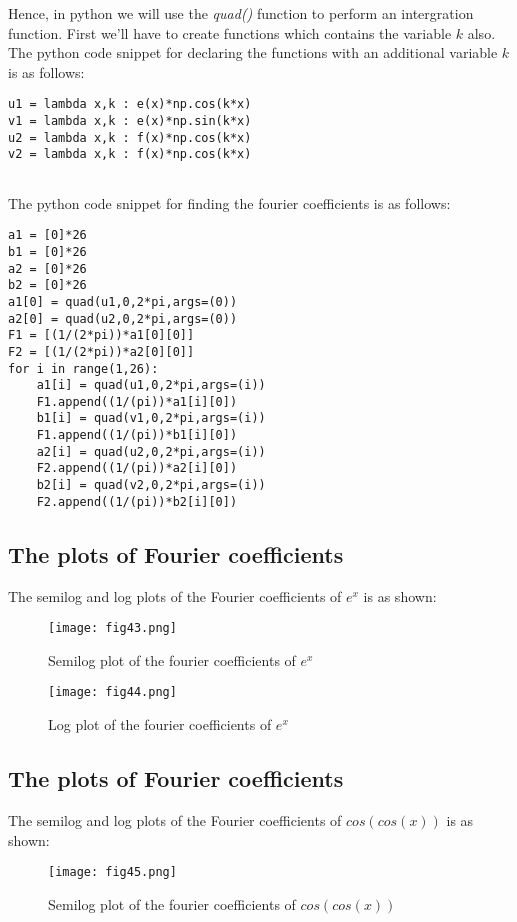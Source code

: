 \documentclass[11pt, a4paper, twoside]{article}
\begin{document}
Hence, in python we will use the \textit{quad()} function to perform an intergration function. First we'll have to create functions which contains the variable $k$ also. The python code snippet for declaring the functions with an additional variable $k$ is as follows:
\begin{verbatim}
u1 = lambda x,k : e(x)*np.cos(k*x)
v1 = lambda x,k : e(x)*np.sin(k*x)
u2 = lambda x,k : f(x)*np.cos(k*x)
v2 = lambda x,k : f(x)*np.cos(k*x)
	
\end{verbatim}
The python code snippet for finding the fourier coefficients is as follows:
\begin{verbatim}
a1 = [0]*26 
b1 = [0]*26
a2 = [0]*26
b2 = [0]*26
a1[0] = quad(u1,0,2*pi,args=(0))  
a2[0] = quad(u2,0,2*pi,args=(0))
F1 = [(1/(2*pi))*a1[0][0]]
F2 = [(1/(2*pi))*a2[0][0]]
for i in range(1,26):
    a1[i] = quad(u1,0,2*pi,args=(i))
    F1.append((1/(pi))*a1[i][0])
    b1[i] = quad(v1,0,2*pi,args=(i))
    F1.append((1/(pi))*b1[i][0])
    a2[i] = quad(u2,0,2*pi,args=(i))
    F2.append((1/(pi))*a2[i][0])
    b2[i] = quad(v2,0,2*pi,args=(i))
    F2.append((1/(pi))*b2[i][0])
\end{verbatim}

\subsection{The plots of Fourier coefficients}
The semilog and log plots of the Fourier coefficients of  $e^{x}$ is as shown:

	\begin{figure}[!tbh]
   	\centering 
   	\texttt{[image: fig43.png]}   
   	\caption{Semilog plot of the fourier coefficients of $e^{x}$}
   	\label{fig:sample}
   \end{figure} 

	\begin{figure}[!tbh]
   	\centering
   	\texttt{[image: fig44.png]}   
   	\caption{Log plot of the fourier coefficients of $e^{x}$}
   \end{figure}
   \newpage
\subsection{The plots of Fourier coefficients}
The semilog and log plots of the Fourier coefficients of  $cos(cos(x))$ is as shown:
	\begin{figure}[!tbh]
   	\centering
   	\texttt{[image: fig45.png]}   
   	\caption{Semilog plot of the fourier coefficients of $cos(cos(x))$}
   	\label{fig:sample}
   \end{figure} 
\end{document}
